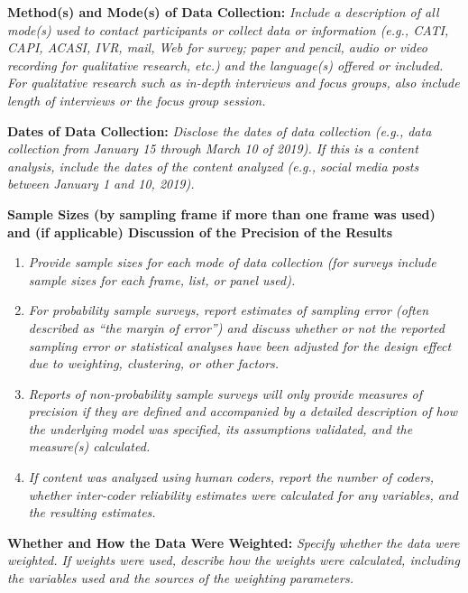 \documentclass{article}
\begin{document}
\medskip

\textbf{Method(s) and Mode(s) of Data Collection:} \textit{Include a description of all mode(s) used to contact participants or collect data or information (e.g., CATI, CAPI, ACASI, IVR, mail, Web for survey; paper and pencil, audio or video recording for qualitative research, etc.) and the language(s) offered or included. For qualitative research such as in-depth interviews and focus groups, also include length of interviews or the focus group session.}

\medskip

\textbf{Dates of Data Collection:} \textit{Disclose the dates of data collection (e.g., data collection from January 15 through March 10 of 2019). If this is a content analysis, include the dates of the content analyzed (e.g., social media posts between January 1 and 10, 2019).}

\medskip

\textbf{Sample Sizes (by sampling frame if more than one frame was used) and (if applicable) Discussion of the Precision of the Results}

\begin{enumerate}

\item \textit{Provide sample sizes for each mode of data collection (for surveys include sample sizes for each frame, list, or panel used).}

\item \textit{For probability sample surveys, report estimates of sampling error (often described as ``the margin of error'') and discuss whether or not the reported sampling error or statistical analyses have been adjusted for the design effect due to weighting, clustering, or other factors.}

\item \textit{Reports of non-probability sample surveys will only provide measures of precision if they are defined and accompanied by a detailed description of how the underlying model was specified, its assumptions validated, and the measure(s) calculated.}

\item \textit{If content was analyzed using human coders, report the number of coders, whether inter-coder reliability estimates were calculated for any variables, and the resulting estimates.}

\end{enumerate}

\textbf{Whether and How the Data Were Weighted:} \textit{Specify whether the data were weighted. If weights were used, describe how the weights were calculated, including the variables used and the sources of the weighting parameters.}
\end{document}
